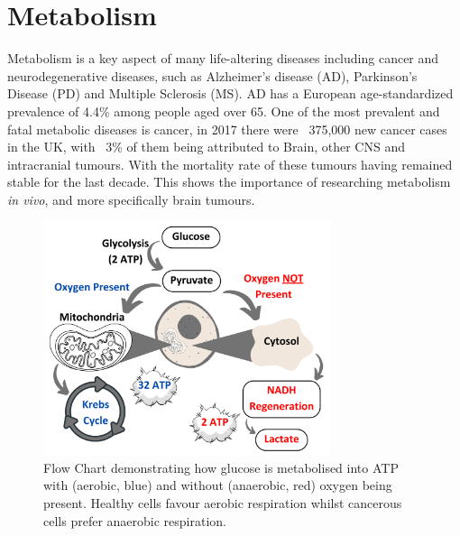 \documentclass[class=article, crop=false]{standalone}
\begin{document}
\section{Metabolism}

Metabolism is a key aspect of many life-altering diseases including cancer and neurodegenerative diseases, such as Alzheimer's disease (AD), Parkinson's Disease (PD) and Multiple Sclerosis (MS)\cite{Gialleonardo2016TheImaging}. AD has a European age-standardized prevalence of 4.4\% among people aged over 65\cite{Qiu2009EpidemiologyIntervention}. One of the most prevalent and fatal metabolic diseases is cancer, in 2017 there were ~375,000 new cancer cases in the UK\cite{CancerUK}, with ~3\% of them being attributed to Brain, other CNS and intracranial tumours\cite{BrainUK}. With the mortality rate of these tumours having remained stable for the last decade\cite{BrainUK}. This shows the importance of researching metabolism \textit{in vivo}, and more specifically brain tumours.

\begin{figure}
    \centering
    \includegraphics[width=0.75\textwidth]{Figures/Intro/Metabolism.png}
    \caption{Flow Chart demonstrating how glucose is metabolised into ATP with (aerobic, blue) and without (anaerobic, red) oxygen being present. Healthy cells favour aerobic respiration whilst cancerous cells prefer anaerobic respiration.}
    \label{fig:intro:Metabolism}
\end{figure}
\end{document}
